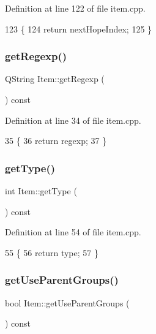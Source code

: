 Definition at line 122 of file item.\+cpp.


\begin{DoxyCode}
123 \{
124     \textcolor{keywordflow}{return} nextHopeIndex;
125 \}
\end{DoxyCode}
\mbox{\label{class_item_a5ef326c2ff5f7836cce5b217ab86924f}} 
\subsubsection{\texorpdfstring{get\+Regexp()}{getRegexp()}}
{\footnotesize\ttfamily Q\+String Item\+::get\+Regexp (\begin{DoxyParamCaption}{ }\end{DoxyParamCaption}) const}



Definition at line 34 of file item.\+cpp.


\begin{DoxyCode}
35 \{
36     \textcolor{keywordflow}{return} regexp;
37 \}
\end{DoxyCode}
\mbox{\label{class_item_a4bec7c4c9b1397ba6ed6e65bcde7b3e8}} 
\subsubsection{\texorpdfstring{get\+Type()}{getType()}}
{\footnotesize\ttfamily int Item\+::get\+Type (\begin{DoxyParamCaption}{ }\end{DoxyParamCaption}) const}



Definition at line 54 of file item.\+cpp.


\begin{DoxyCode}
55 \{
56     \textcolor{keywordflow}{return} type;
57 \}
\end{DoxyCode}
\mbox{\label{class_item_a09651004e3d1e354981d45d5988d6073}} 
\subsubsection{\texorpdfstring{get\+Use\+Parent\+Groups()}{getUseParentGroups()}}
{\footnotesize\ttfamily bool Item\+::get\+Use\+Parent\+Groups (\begin{DoxyParamCaption}{ }\end{DoxyParamCaption}) const}



